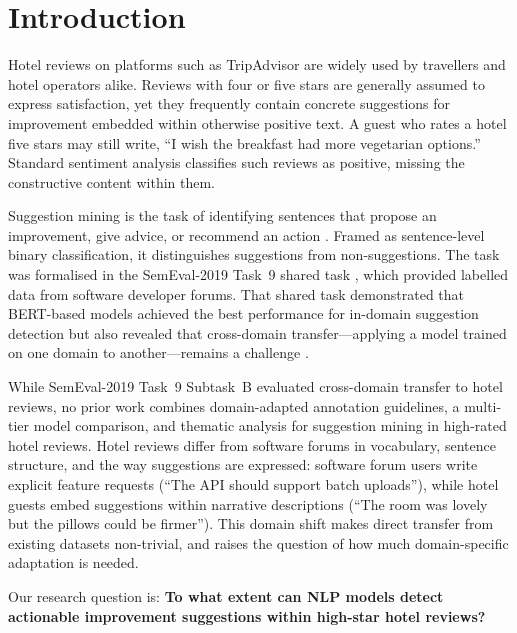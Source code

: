 \section{Introduction}

Hotel reviews on platforms such as TripAdvisor are widely used by travellers and
hotel operators alike. Reviews with four or five stars are generally assumed to
express satisfaction, yet they frequently contain concrete suggestions for
improvement embedded within otherwise positive text. A guest who rates a hotel
five stars may still write, ``I wish the breakfast had more vegetarian
options.'' Standard sentiment analysis classifies such reviews as positive,
missing the constructive content within them.

Suggestion mining is the task of identifying sentences that propose an
improvement, give advice, or recommend an action \citep{negi2018open}. Framed as
sentence-level binary classification, it distinguishes suggestions from
non-suggestions. The task was formalised in the SemEval-2019 Task~9 shared task
\citep{negi2019semeval}, which provided labelled data from software developer
forums. That shared task demonstrated that BERT-based models achieved the best
performance for in-domain suggestion detection but also revealed that
cross-domain transfer---applying a model trained on one domain to
another---remains a challenge \citep{park2019bert}.

While SemEval-2019 Task~9 Subtask~B evaluated cross-domain
transfer to hotel reviews, no prior work combines
domain-adapted annotation guidelines, a multi-tier model
comparison, and thematic analysis for suggestion mining in
high-rated hotel reviews. Hotel reviews differ from software forums in
vocabulary, sentence structure, and the way suggestions are expressed:
software forum users write explicit feature requests (``The API should support
batch uploads''), while hotel guests embed suggestions within narrative
descriptions (``The room was lovely but the pillows could be firmer''). This
domain shift makes direct transfer from existing datasets non-trivial, and
raises the question of how much domain-specific adaptation is needed.

Our research question is: \textbf{To what extent can NLP models detect
actionable improvement suggestions within high-star hotel reviews?}

